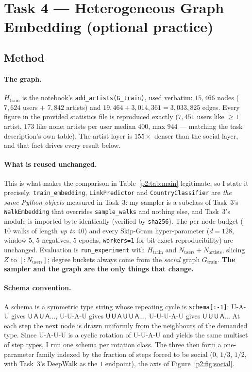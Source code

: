 \section{Task 4 --- Heterogeneous Graph Embedding (optional practice)}
\label{p2:sec:main}

\subsection{Method}
\label{p2:sec:method}

\paragraph{The graph.}
$H_{\mathrm{train}}$ is the notebook's \texttt{add\_artists(G\_train)}, used verbatim:
$15{,}466$ nodes ($7{,}624$ users $+$ $7{,}842$ artists) and
$19{,}464 + 3{,}014{,}361 = 3{,}033{,}825$ edges.  Every figure in the provided statistics
file is reproduced exactly ($7{,}451$ users like $\ge1$ artist, $173$ like none; artists per
user median $400$, max $944$ --- matching the task description's own table).  The artist
layer is $155\times$ denser than the social layer, and that fact drives every result below.

\paragraph{What is reused unchanged.}
This is what makes the comparison in Table~\ref{p2:tab:main} legitimate, so I state it
precisely.  \texttt{train\_embedding}, \texttt{LinkPredictor} and
\texttt{CountryClassifier} are \emph{the same Python objects} measured in Task~3: my
sampler is a subclass of Task~3's \texttt{WalkEmbedding} that overrides
\texttt{sample\_walks} and nothing else, and Task~3's module is imported byte-identically
(verified by \texttt{sha256}).  The per-node budget ($10$ walks of length \emph{up to} $40$)
and every Skip-Gram hyper-parameter ($d{=}128$, window $5$, $5$ negatives, $5$ epochs,
\texttt{workers=1} for bit-exact reproducibility) are unchanged.  Evaluation is
\texttt{run\_experiment} with $H_{\mathrm{train}}$ and $N_{\mathrm{users}}+N_{\mathrm{artists}}$,
slicing $Z$ to $[:N_{\mathrm{users}}]$; degree buckets always come from the \emph{social}
graph $G_{\mathrm{train}}$.  \textbf{The sampler and the graph are the only things that
change.}

\paragraph{Schema convention.}
A schema is a symmetric type string whose repeating cycle is \texttt{schema[:-1]}:
\textsf{U-A-U} gives $\mathsf{U\,A\,U\,A}\dots$, \textsf{U-U-A-U} gives
$\mathsf{U\,U\,A\,U\,U\,A}\dots$, \textsf{U-U-U-A-U} gives $\mathsf{U\,U\,U\,A}\dots$
At each step the next node is drawn uniformly from the neighbours of the demanded type.
Since \textsf{U-A-U-U} is a cyclic rotation of \textsf{U-U-A-U} and yields the same
multiset of step types, I run one schema per rotation class.  The three then form a
one-parameter family indexed by the fraction of steps forced to be social ($0$, $1/3$,
$1/2$, with Task~3's DeepWalk as the $1$ endpoint), the axis of
Figure~\ref{p2:fig:social}.

